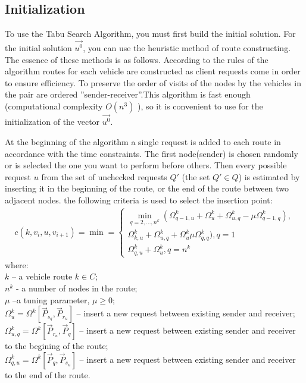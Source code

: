 \documentclass[]{TAACpaper}
\begin{document}
\subsection{Initialization}
To use the Tabu Search Algorithm, you must first build the initial solution. For the initial solution $ \vec{u^0} $, you can use the heuristic method of route constructing\cite {Cordeau2001, Braysy}. The essence of these methods is as follows. According to the rules of the algorithm routes for each vehicle are constructed as client requests come in order to ensure efficiency.  
To preserve the order of visits of the nodes by the vehicles in the pair are ordered ''sender-receiver''.This algorithm is fast enough (computational complexity $O(n^3)$ \cite{Babb}), so it is convenient to use for the initialization of the vector $\vec{u^0}$.

At the beginning of the algorithm a single request is added to each route in accordance with the time constraints. The first node(sender) is chosen randomly or is selected the one you want to perform before others. Then every possible request $u$ from the set of unchecked requests $ Q' $ (the set $ Q'\in Q$) is estimated by inserting it in the beginning of the route, or the end of the route between two adjacent nodes. the following criteria is used to select the insertion point:
\begin{align} 
\label{insert_kr}
c(k,v_i,u,v_{i+1}) = \min =
\begin{cases}
\min_{q=2,\dots,n^k}(\Omega_{q-1,u}^k+\Omega_{u}^{k}+\Omega_{u,q}^{k}-\mu \Omega_{q-1,q}^k),\\
\Omega_{k,u}^k+\Omega_{u,q}^k+\Omega_{u}^k\mu \Omega_{q,q}^k), q=1\\
\Omega_{q,u}^k+\Omega_{u}^k, q=n^k
\end{cases}
\end{align} 
where:\\
$k$ --  a vehicle route $k\in C$;\\
$n^k$ - a number of nodes in the route;\\
$\mu$ --a tuning parameter, $\mu \ge 0 $;\\
$\Omega_{u}^k=\Omega^k[\vec{P}_{s_q}, \vec{P}_{r_u}]$ -- insert a new request between existing sender and receiver;\\
$\Omega_{u,q}^k=\Omega^k[\vec{P}_{r_u}, \vec{P}_{q}]$ -- insert a new request between existing sender and receiver to the begining of the route;\\
$\Omega_{q,u}^k=\Omega^k[\vec{P}_{q}, \vec{P}_{s_u}]$ -- insert a new request between existing sender and receiver to the end of the route.
\end{document}
